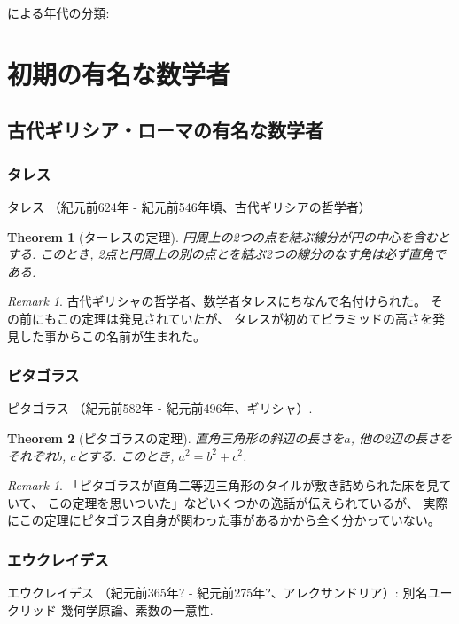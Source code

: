 \documentclass[a4paper,12pt]{jsarticle}
\theoremstyle{plain}
\newtheorem{theoremX}{Theorem}
\theoremstyle{remark}  %
\newtheorem{remark}[thm]{Remark}
\theoremstyle{definition}  %
\begin{document}
\cite{wiki:数学者の一覧}による年代の分類:
\section{初期の有名な数学者}
\subsection{古代ギリシア・ローマの有名な数学者}
\subsubsection{タレス}
タレス\cite{wiki:タレス}
（紀元前624年 - 紀元前546年頃、古代ギリシアの哲学者）

\begin{theoremX}[ターレスの定理]
円周上の2つの点を結ぶ線分が円の中心を含むとする.
このとき,
2点と円周上の別の点とを結ぶ2つの線分のなす角は必ず直角である.
\end{theoremX}

\begin{remark}
古代ギリシャの哲学者、数学者タレスにちなんで名付けられた。
その前にもこの定理は発見されていたが、
タレスが初めてピラミッドの高さを発見した事からこの名前が生まれた。
\cite{wiki:タレスの定理}
\end{remark}


\subsubsection{ピタゴラス}
ピタゴラス\cite{wiki:ピタゴラス}
（紀元前582年 - 紀元前496年、ギリシャ）.

\begin{theoremX}[ピタゴラスの定理]
  直角三角形の斜辺の長さを$a$, 他の2辺の長さをそれぞれ$b$, $c$とする.
  このとき, $a^2=b^2+c^2$.
\end{theoremX}

\begin{remark}
「ピタゴラスが直角二等辺三角形のタイルが敷き詰められた床を見ていて、
  この定理を思いついた」などいくつかの逸話が伝えられているが、
実際にこの定理にピタゴラス自身が関わった事があるかから全く分かっていない。
\cite{wiki:ピタゴラスの定理}
\end{remark}

\subsubsection{エウクレイデス}
エウクレイデス
\cite{wiki:エウクレイデス}
（紀元前365年? - 紀元前275年?、アレクサンドリア）: 別名ユークリッド 幾何学原論、素数の一意性.
\end{document}
